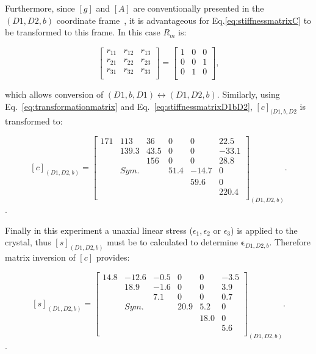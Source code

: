 \noindent Furthermore, since $[g]$ and $[A]$ are conventionally presented in the $(D1,D2,b)$ coordinate frame~\citep{PhysRevB.94.155116}, it is advantageous for Eq.\ref{eq:stiffnessmatrixC} to be transformed to this frame. In this case $R_{m}$ is:

\begin{equation}
\label{eq:rotateatoswitchbD2axis}
\begin{bmatrix}
r_{11} & r_{12} & r_{13} \\
r_{21} & r_{22} & r_{23} \\
r_{31} & r_{32} & r_{33} \\
\end{bmatrix}=
\begin{bmatrix}
1 & 0 & 0 \\
0 & 0 & 1 \\
0 & 1 & 0 \\
\end{bmatrix},
\end{equation}

\noindent which allows conversion of $(D1,b,D1)\leftrightarrow (D1,D2,b)$. Similarly, using Eq.~\ref{eq:transformationmatrix} and Eq.~\ref{eq:stiffnessmatrixD1bD2}, $[c]_{(D1,b,D2}$ is transformed to:

\begin{equation}
\label{eq:stiffnessmatrixCD1D2b}
[c]_{(D1,D2,b)}=\begin{bmatrix}
171 & 113 & 36 & 0 & 0 & 22.5 \\
& 139.3 & 43.5 & 0 & 0 & -33.1 \\
& & 156 & 0 & 0 & 28.8 \\
& Sym. & & 51.4 & -14.7 & 0 \\
& & & & 59.6 & 0 \\
& & & & & 220.4 \\
\end{bmatrix}_{(D1,D2,b)}.
\end{equation}.

\noindent Finally in this experiment a unaxial linear stress ($\epsilon_{1}, \epsilon_{2}$ or $\epsilon_{3}$) is applied to the crystal, thus $[s]_{(D1,D2,b)}$ must be to calculated to determine $\bm{\epsilon}_{D1,D2,b}$. Therefore matrix inversion of $[c]$ provides:

\begin{equation}
\label{eq:stiffnessmatrixCD1D2b}
[s]_{(D1,D2,b)}=\begin{bmatrix}
14.8 & -12.6 & -0.5 & 0 & 0 & -3.5 \\
& 18.9 & -1.6 & 0 & 0 & 3.9 \\
& & 7.1 & 0 & 0 & 0.7 \\
& Sym. & & 20.9 & 5.2 & 0 \\
& & & & 18.0 & 0 \\
& & & & & 5.6 \\
\end{bmatrix}_{({D1},{D2},{b})}.
\end{equation}.

